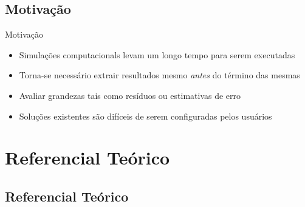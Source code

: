 \documentclass[12pt,compress]{beamer}
\begin{document}

\subsection*{Motivação}

\begin{frame}{Motivação}

\begin{itemize}
    \item Simulações computacionals levam um longo tempo para serem executadas %
    \item Torna-se necessário extrair resultados mesmo \emph{antes} do término das mesmas
    \pause
    \item Avaliar grandezas tais como resíduos ou estimativas de erro
    \item Soluções existentes são difíceis de serem configuradas pelos usuários
\end{itemize}

\end{frame}


\section{Referencial Teórico}
\subsection*{Referencial Teórico}
\end{document}
